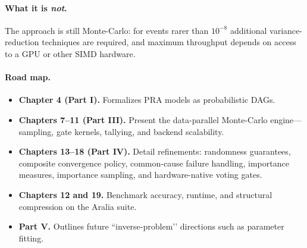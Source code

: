 \paragraph*{What it is \emph{not}.}
The approach is still Monte-Carlo: for events rarer than
\(10^{-8}\) additional variance-reduction techniques are required, and
maximum throughput depends on access to a GPU or other SIMD hardware.


\paragraph*{Road map.}
\begin{itemize}
  \item \textbf{Chapter 4 (Part I).} Formalizes PRA models as probabilistic DAGs. 
  \item \textbf{Chapters 7–11 (Part III).} Present the data-parallel Monte-Carlo engine—sampling, gate kernels, tallying, and backend scalability. 
  \item \textbf{Chapters 13–18 (Part IV).} Detail refinements: randomness guarantees, composite convergence policy, common-cause failure handling, importance measures, importance sampling, and hardware-native voting gates. 
  \item \textbf{Chapters 12 and 19.} Benchmark accuracy, runtime, and structural compression on the Aralia suite. 
  \item \textbf{Part V.} Outlines future “inverse-problem’’ directions such as parameter fitting.
\end{itemize}


